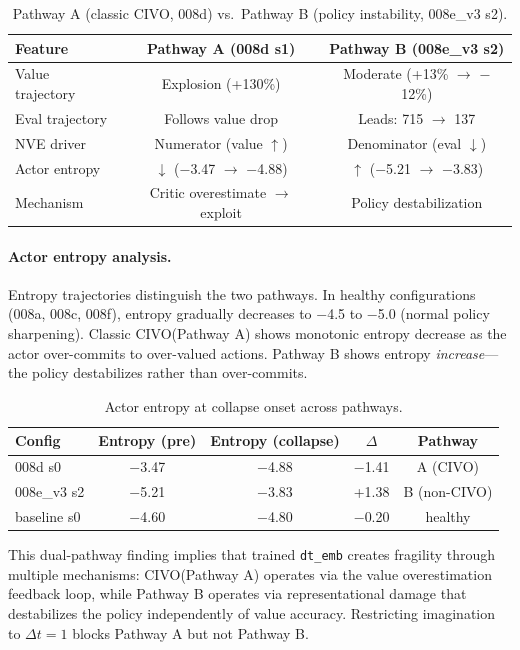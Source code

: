 \documentclass[letterpaper]{article}
\newcommand{\civo}{CIVO\xspace}
\newcommand{\dtemb}{\texttt{dt\_emb}\xspace}
\begin{document}
\begin{table}[h]
\centering
\caption{Pathway A (classic \civo, 008d) vs.\ Pathway B (policy instability, 008e\_v3 s2).}
\label{tab:pathways}
\begin{tabular}{lcc}
\toprule
Feature & Pathway A (008d s1) & Pathway B (008e\_v3 s2) \\
\midrule
Value trajectory & Explosion (+130\%) & Moderate (+13\% $\to$ $-$12\%) \\
Eval trajectory & Follows value drop & Leads: 715 $\to$ 137 \\
NVE driver & Numerator (value $\uparrow$) & Denominator (eval $\downarrow$) \\
Actor entropy & $\downarrow$ ($-$3.47 $\to$ $-$4.88) & $\uparrow$ ($-$5.21 $\to$ $-$3.83) \\
Mechanism & Critic overestimate $\to$ exploit & Policy destabilization \\
\bottomrule
\end{tabular}
\end{table}

\paragraph{Actor entropy analysis.}
Entropy trajectories distinguish the two pathways. In healthy configurations (008a, 008c, 008f), entropy gradually decreases to $-$4.5 to $-$5.0 (normal policy sharpening). Classic \civo (Pathway A) shows monotonic entropy decrease as the actor over-commits to over-valued actions. Pathway B shows entropy \emph{increase}---the policy destabilizes rather than over-commits.

\begin{table}[h]
\centering
\caption{Actor entropy at collapse onset across pathways.}
\label{tab:entropy}
\begin{tabular}{lcccc}
\toprule
Config & Entropy (pre) & Entropy (collapse) & $\Delta$ & Pathway \\
\midrule
008d s0 & $-$3.47 & $-$4.88 & $-$1.41 & A (CIVO) \\
008e\_v3 s2 & $-$5.21 & $-$3.83 & +1.38 & B (non-CIVO) \\
baseline s0 & $-$4.60 & $-$4.80 & $-$0.20 & healthy \\
\bottomrule
\end{tabular}
\end{table}

This dual-pathway finding implies that trained \dtemb creates fragility through multiple mechanisms: \civo (Pathway A) operates via the value overestimation feedback loop, while Pathway B operates via representational damage that destabilizes the policy independently of value accuracy. Restricting imagination to $\Delta t = 1$ blocks Pathway A but not Pathway B.
\end{document}
